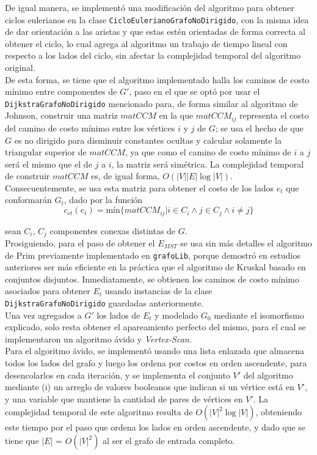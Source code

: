 \documentclass[11pt]{article}
\begin{document}
De igual manera, se implementó una modificación del algoritmo para
obtener ciclos eulerianos en la clase \texttt{CicloEulerianoGrafoNoDirigido},
con la misma idea de dar orientación a las aristas y que estas estén
orientadas de forma correcta al obtener el ciclo, lo cual agrega al
algoritmo un trabajo de tiempo lineal con respecto a los lados del
ciclo, sin afectar la complejidad temporal del algoritmo original. \\

De esta forma, se tiene que el algoritmo implementado halla los caminos
de costo mínimo entre componentes de $G'$, paso en el que se optó por usar
el \texttt{DijkstraGrafoNoDirigido} mencionado para, de forma similar
al algoritmo de Johnson, construir una matriz $matCCM$ en la que $matCCM_{ij}$
representa el costo del camino de costo mínimo entre los vértices $i$ y $j$ de
$G$; se usa el hecho de que $G$ es no dirigido para disminuir constantes ocultas
y calcular solamente la triangular superior de $matCCM$, ya que como el camino de 
costo mínimo de $i$ a $j$ será el mismo que el de $j$ a $i$, la matriz será simétrica.
La complejidad temporal de construir $matCCM$ es, de igual forma, $O(|V||E|\log|V|)$. \\ 

Consecuentemente, se usa esta matriz para obtener el costo de los lados $e_t$ que
conformarán $G_t$, dado por la función
\[
   c_{et}(e_t) = \text{mín}\{matCCM_{ij} | i \in C_i \land j \in C_j \land i \neq j \}
\]

sean $C_i$, $C_j$ componentes conexas distintas de $G$. \\

Prosiguiendo, para el paso de obtener el $E_{MST}$ se usa sin más detalles el algoritmo
de Prim previamente implementado en \texttt{grafoLib}, porque demostró en estudios
anteriores ser más eficiente en la práctica que el algoritmo de Kruskal basado en
conjuntos disjuntos. Inmediatamente, se obtienen los caminos de costo mínimo asociados
para obtener $E_t$ usando instancias de la clase \texttt{DijkstraGrafoNoDirigido} guardadas
anteriormente. \\

Una vez agregados a $G'$ los lados de $E_t$ y modelado $G_0$ mediante el isomorfismo 
explicado, solo resta obtener el apareamiento perfecto del mismo, para el cual se
implementaron un algoritmo ávido y \emph{Vertex-Scan}. \\

Para el algoritmo ávido, se implementó usando una lista enlazada que almacena todos
los lados del grafo y luego los ordena por costos en orden ascendente, para
desencolarlos en cada iteración, y se implementa el conjunto $V'$ del
algoritmo mediante (i) un arreglo de valores booleanos que indican si un 
vértice está en $V'$, y una variable que mantiene la cantidad de pares de vértices
en $V'$. La complejidad temporal de este algoritmo resulta de $O(|V|^2\log|V|)$,
obteniendo este tiempo por el paso que ordena los lados en orden ascendente, y
dado que se tiene que $|E|$ = $O(|V|^2)$ al ser el grafo de entrada completo. \\
\end{document}

